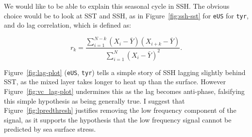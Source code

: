 



\label{sec:lag}



We would like to be able to explain this seasonal cycle in SSH.
The obvious choice would be to look at SST and SSH, as in Figure~\ref{fig:ssh-sst}
for \texttt{eUS} for \texttt{tyr}, and do lag correlation, which is defined as:

\begin{equation}
r_{k}=
\frac{\sum_{i=1}^{N-k}\left(X_{i}
-\bar{Y}\right)\left(X_{i+k}-\bar{Y}\right)}
{\sum_{i=1}^{N}\left(X_{i}
-\bar{Y}\right)^{2}}.
\end{equation}

Figure~\ref{fig:lag-plot} (\texttt{eUS}, \texttt{tyr}) tells a simple story of
SSH lagging slightly behind SST, as the mixed layer takes longer
to heat up than the surface.
However Figure~\ref{fig:vc_lag-plot} undermines this as the
lag becomes anti-phase, falsifying this simple hypothesis as
being generally true.
I suggest that Figure~\ref{fig:lpredthresh} justifies removing the low frequency
component of the signal, as it supports the hypothesis that the
low frequency signal cannot be predicted by sea surface stress.

\FloatBarrier
